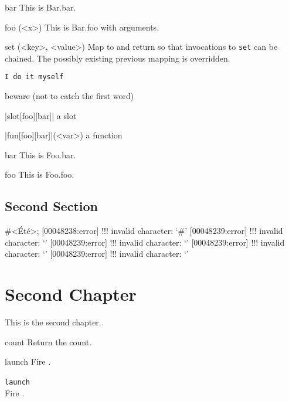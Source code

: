 \documentclass[openright,twoside,11pt]{book}
\begin{document}

\begin{urbiscriptapi}
\item[bar] This is Bar.bar.
\item[foo](<x>) This is Bar.foo with arguments.
\item[set](<key>, <value>) Map  to  and return \this so
  that invocations to \lstinline|set| can be chained.  The possibly existing
  previous mapping is overridden.
\item \lstinline|I do it myself|
\item beware (not to catch the first word)
\item|slot[foo][bar]| a slot
\item|fun[foo][bar]|(<var>) a function
\end{urbiscriptapi}


\begin{urbiscriptapi}
\item[bar] This is Foo.bar.
\item[foo] This is Foo.foo.
\end{urbiscriptapi}

\section{Second Section}

\begin{urbiunchecked}[escapeinside=<>]
#<Été>;
[00048238:error] !!! invalid character: `#'
[00048239:error] !!! invalid character: `'
[00048239:error] !!! invalid character: `'
[00048239:error] !!! invalid character: `'
[00048239:error] !!! invalid character: `'
\end{urbiunchecked}

\chapter{Second Chapter}

This is the second chapter.



\begin{urbiscriptapi}
\item[count] Return the count.
\item[launch]
  Fire \this.
\item \lstinline|launch|~\\
  Fire \this.
\end{urbiscriptapi}
\end{document}
